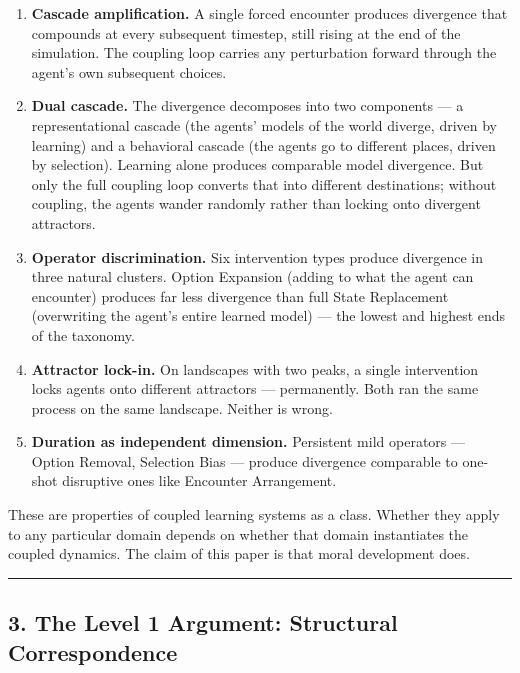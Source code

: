 \documentclass[
]{article}
\providecommand{\tightlist}{%
  \setlength{\itemsep}{0pt}\setlength{\parskip}{0pt}}
\begin{document}
\begin{enumerate}
\def\labelenumi{\arabic{enumi}.}
\tightlist
\item
  \textbf{Cascade amplification.} A single forced encounter produces
  divergence that compounds at every subsequent timestep, still rising
  at the end of the simulation. The coupling loop carries any
  perturbation forward through the agent's own subsequent choices.
\item
  \textbf{Dual cascade.} The divergence decomposes into two components
  --- a representational cascade (the agents' models of the world
  diverge, driven by learning) and a behavioral cascade (the agents go
  to different places, driven by selection). Learning alone produces
  comparable model divergence. But only the full coupling loop converts
  that into different destinations; without coupling, the agents wander
  randomly rather than locking onto divergent attractors.
\item
  \textbf{Operator discrimination.} Six intervention types produce
  divergence in three natural clusters. Option Expansion (adding to what
  the agent can encounter) produces far less divergence than full State
  Replacement (overwriting the agent's entire learned model) --- the
  lowest and highest ends of the taxonomy.
\item
  \textbf{Attractor lock-in.} On landscapes with two peaks, a single
  intervention locks agents onto different attractors --- permanently.
  Both ran the same process on the same landscape. Neither is wrong.
\item
  \textbf{Duration as independent dimension.} Persistent mild operators
  --- Option Removal, Selection Bias --- produce divergence comparable
  to one-shot disruptive ones like Encounter Arrangement.
\end{enumerate}

These are properties of coupled learning systems as a class. Whether
they apply to any particular domain depends on whether that domain
instantiates the coupled dynamics. The claim of this paper is that moral
development does.

\begin{center}\rule{0.5\linewidth}{0.5pt}\end{center}

\subsection{3. The Level 1 Argument: Structural
Correspondence}\label{the-level-1-argument-structural-correspondence}
\end{document}
